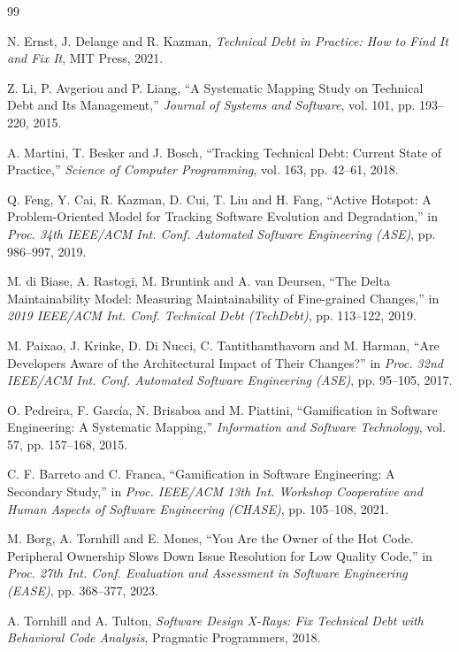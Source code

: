 \begin{thebibliography}{99}

N. Ernst, J. Delange and R. Kazman,
\textit{Technical Debt in Practice: How to Find It and Fix It},
MIT Press, 2021.

Z. Li, P. Avgeriou and P. Liang,
``A Systematic Mapping Study on Technical Debt and Its Management,''
\textit{Journal of Systems and Software}, vol. 101, pp. 193--220, 2015.

A. Martini, T. Besker and J. Bosch,
``Tracking Technical Debt: Current State of Practice,''
\textit{Science of Computer Programming}, vol. 163, pp. 42--61, 2018.

Q. Feng, Y. Cai, R. Kazman, D. Cui, T. Liu and H. Fang,
``Active Hotspot: A Problem-Oriented Model for Tracking Software Evolution and Degradation,''
in \textit{Proc. 34th IEEE/ACM Int. Conf. Automated Software Engineering (ASE)}, pp. 986--997, 2019.

M. di Biase, A. Rastogi, M. Bruntink and A. van Deursen,
``The Delta Maintainability Model: Measuring Maintainability of Fine-grained Changes,''
in \textit{2019 IEEE/ACM Int. Conf. Technical Debt (TechDebt)}, pp. 113--122, 2019.

M. Paixao, J. Krinke, D. Di Nucci, C. Tantithamthavorn and M. Harman,
``Are Developers Aware of the Architectural Impact of Their Changes?''
in \textit{Proc. 32nd IEEE/ACM Int. Conf. Automated Software Engineering (ASE)}, pp. 95--105, 2017.

O. Pedreira, F. García, N. Brisaboa and M. Piattini,
``Gamification in Software Engineering: A Systematic Mapping,''
\textit{Information and Software Technology}, vol. 57, pp. 157--168, 2015.

C. F. Barreto and C. Franca,
``Gamification in Software Engineering: A Secondary Study,''
in \textit{Proc. IEEE/ACM 13th Int. Workshop Cooperative and Human Aspects of Software Engineering (CHASE)},
pp. 105--108, 2021.

M. Borg, A. Tornhill and E. Mones,
``You Are the Owner of the Hot Code. Peripheral Ownership Slows Down Issue Resolution for Low Quality Code,''
in \textit{Proc. 27th Int. Conf. Evaluation and Assessment in Software Engineering (EASE)}, pp. 368--377, 2023.

A. Tornhill and A. Tulton,
\textit{Software Design X-Rays: Fix Technical Debt with Behavioral Code Analysis},
Pragmatic Programmers, 2018.


\end{thebibliography}
